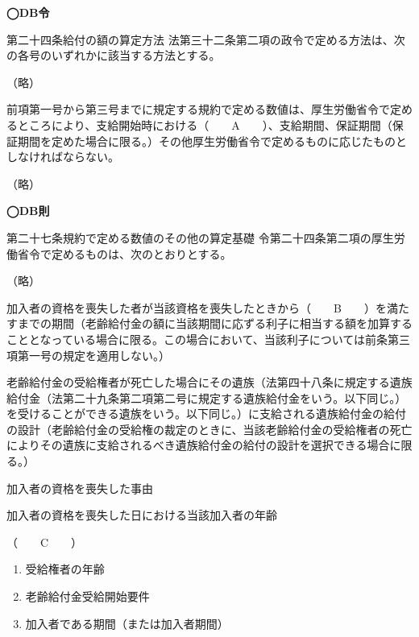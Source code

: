 \begin{fillblank}[年金1 2019 問題1(1)DEF]
  \noindent \textbf{◯DB令}
  \begin{lawstructure}
    \begin{lawarticle}{第二十四条}{給付の額の算定方法}
      法第三十二条第二項の政令で定める方法は、次の各号のいずれかに該当する方法とする。

      （略）

      前項第一号から第三号までに規定する規約で定める数値は、厚生労働省令で定めるところにより、支給開始時における（　　A　　）、支給期間、保証期間（保証期間を定めた場合に限る。）その他厚生労働省令で定めるものに応じたものとしなければならない。

      （略）
    \end{lawarticle}

    \noindent \textbf{◯DB則}
    \begin{lawarticle}{第二十七条}{規約で定める数値のその他の算定基礎}
      令第二十四条第二項の厚生労働省令で定めるものは、次のとおりとする。

      （略）

      加入者の資格を喪失した者が当該資格を喪失したときから（　　B　　）を満たすまでの期間（老齢給付金の額に当該期間に応ずる利子に相当する額を加算することとなっている場合に限る。この場合において、当該利子については前条第三項第一号の規定を適用しない。）

      老齢給付金の受給権者が死亡した場合にその遺族（法第四十八条に規定する遺族給付金（法第二十九条第二項第二号に規定する遺族給付金をいう。以下同じ。）を受けることができる遺族をいう。以下同じ。）に支給される遺族給付金の給付の設計（老齢給付金の受給権の裁定のときに、当該老齢給付金の受給権者の死亡によりその遺族に支給されるべき遺族給付金の給付の設計を選択できる場合に限る。）

      加入者の資格を喪失した事由

      加入者の資格を喪失した日における当該加入者の年齢

      （　　C　　）

    \end{lawarticle}
  \end{lawstructure}
\end{fillblank}

\begin{answerbox}
  \begin{enumerate}[A:]
    \item 受給権者の年齢
    \item 老齢給付金受給開始要件
    \item 加入者である期間（または加入者期間）
  \end{enumerate}
\end{answerbox}

